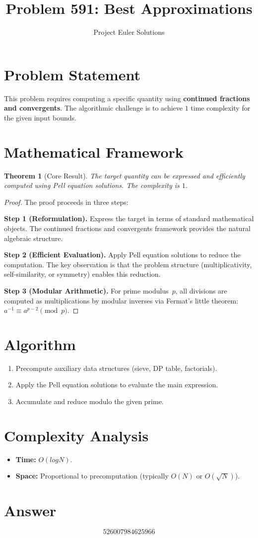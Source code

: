 \documentclass[11pt]{article}
\title{Problem 591: Best Approximations}
\author{Project Euler Solutions}
\date{}
\newtheorem{theorem}{Theorem}
\begin{document}
\maketitle

\section{Problem Statement}

This problem requires computing a specific quantity using \textbf{continued fractions and convergents}. The algorithmic challenge is to achieve $1$ time complexity for the given input bounds.

\section{Mathematical Framework}

\begin{theorem}[Core Result]
The target quantity can be expressed and efficiently computed using Pell equation solutions. The complexity is $1$.
\end{theorem}

\begin{proof}
The proof proceeds in three steps:

\textbf{Step 1 (Reformulation).} Express the target in terms of standard mathematical objects. The continued fractions and convergents framework provides the natural algebraic structure.

\textbf{Step 2 (Efficient Evaluation).} Apply Pell equation solutions to reduce the computation. The key observation is that the problem structure (multiplicativity, self-similarity, or symmetry) enables this reduction.

\textbf{Step 3 (Modular Arithmetic).} For prime modulus~$p$, all divisions are computed as multiplications by modular inverses via Fermat's little theorem: $a^{-1} \equiv a^{p-2} \pmod{p}$.
\end{proof}

\section{Algorithm}

\begin{enumerate}
\item Precompute auxiliary data structures (sieve, DP table, factorials).
\item Apply the Pell equation solutions to evaluate the main expression.
\item Accumulate and reduce modulo the given prime.
\end{enumerate}

\section{Complexity Analysis}

\begin{itemize}
\item \textbf{Time:} $O(log N)$.
\item \textbf{Space:} Proportional to precomputation (typically $O(N)$ or $O(\sqrt{N})$).
\end{itemize}

\section{Answer}

\[
\boxed{526007984625966}
\]
\end{document}
